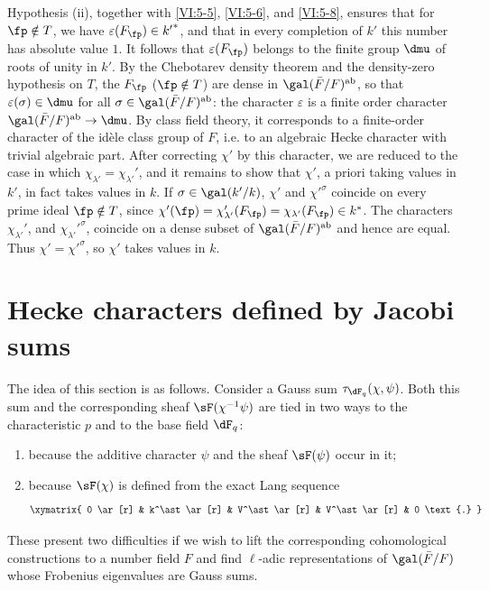 Hypothesis (ii), together with \ref{VI:5-5}, \ref{VI:5-6}, and \ref{VI:5-8}, ensures that 
for $\fp\notin T$, we have $\varepsilon(F_\fp)\in {k'}^\ast$, and that in every 
completion of $k'$ this number has absolute value $1$. It follows that 
$\varepsilon(F_\fp)$ belongs to the finite group $\dmu$ of roots of unity 
in $k'$. By the Chebotarev density theorem and the density-zero hypothesis 
on $T$, the $F_\fp$ ($\fp\notin T$) are dense in 
  $\gal(\bar F/F)^\text{ab}$, so that $\varepsilon(\sigma)\in \dmu$ for all 
$\sigma\in \gal(\bar F/F)^\text{ab}$: the character $\varepsilon$ is a 
  finite order character $\gal(\bar F/F)^\text{ab}\to \dmu$. By 
class field theory, it corresponds to a finite-order character 
of the idèle class group of $F$, i.e. to an algebraic Hecke character 
with trivial algebraic part. After correcting $\chi'$ by this 
character, we are reduced to the case in which 
$\chi_{\lambda'}=\chi_{\lambda'}'$, and it remains to show that $\chi'$, 
a priori taking values in $k'$, in fact takes values in $k$. If 
$\sigma\in \gal(k'/k)$, $\chi'$ and ${\chi'}^\sigma$ coincide on every prime 
ideal $\fp\notin T$, since 
$\chi'(\fp) = \chi'_{\lambda'}(F_\fp) = \chi_{\lambda'}(F_\fp) \in k^\ast$. 
The characters $\chi_{\lambda'}'$, and ${\chi_{\lambda'}'}^\sigma$, coincide 
on a dense subset of $\gal(\bar F/F)^\text{ab}$ and hence are equal. Thus 
$\chi'={\chi'}^\sigma$, so $\chi'$ takes values in $k$. 











\section{Hecke characters defined by Jacobi sums}\label{VI:6}

The idea of this section is as follows. Consider a Gauss sum 
$\tau_{\dF_q}(\chi,\psi)$. Both this sum and the corresponding sheaf 
$\sF(\chi^{-1}\psi)$ are tied in two ways to the characteristic $p$ and to the 
base field $\dF_q$: 
\begin{enumerate}[\indent a)]
  \item because the additive character $\psi$ and the sheaf 
    $\sF(\psi)$ occur in it; 
  \item because $\sF(\chi)$ is defined from the exact Lang sequence 
    \[\xymatrix{
      0 \ar[r] 
        & k^\ast \ar[r] 
        & V^\ast \ar[r] 
        & V^\ast \ar[r] 
        & 0 \text{.} 
    }\]
\end{enumerate}
These present two difficulties if we wish to lift the corresponding 
cohomological constructions to a number field $F$ and find 
$\ell$-adic representations of $\gal(\bar F/F)$ whose Frobenius eigenvalues 
are Gauss sums. 

